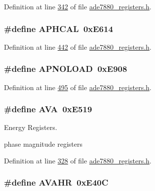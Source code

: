 Definition at line \hyperlink{a00036_source_l00342}{342} of file \hyperlink{a00036_source}{ade7880\-\_\-registers.\-h}.

\hypertarget{a00036_af7bcab75b737ab6d6d02cea33593a062}{
\subsubsection[{A\-P\-H\-C\-A\-L}]{\setlength{\rightskip}{0pt plus 5cm}\#define A\-P\-H\-C\-A\-L~0x\-E614}}\label{de/d8c/a00036_af7bcab75b737ab6d6d02cea33593a062}


Definition at line \hyperlink{a00036_source_l00442}{442} of file \hyperlink{a00036_source}{ade7880\-\_\-registers.\-h}.

\hypertarget{a00036_af3cf7b8f5e0068d118ba353733b37057}{
\subsubsection[{A\-P\-N\-O\-L\-O\-A\-D}]{\setlength{\rightskip}{0pt plus 5cm}\#define A\-P\-N\-O\-L\-O\-A\-D~0x\-E908}}\label{de/d8c/a00036_af3cf7b8f5e0068d118ba353733b37057}


Definition at line \hyperlink{a00036_source_l00495}{495} of file \hyperlink{a00036_source}{ade7880\-\_\-registers.\-h}.

\hypertarget{a00036_ae7cdec48ca69414825f989d1e54ac75e}{
\subsubsection[{A\-V\-A}]{\setlength{\rightskip}{0pt plus 5cm}\#define A\-V\-A~0x\-E519}}\label{de/d8c/a00036_ae7cdec48ca69414825f989d1e54ac75e}


Energy Registers. 

phase magnitude registers 

Definition at line \hyperlink{a00036_source_l00328}{328} of file \hyperlink{a00036_source}{ade7880\-\_\-registers.\-h}.

\hypertarget{a00036_abf7b2fd4affddefe36eeb6297578aae7}{
\subsubsection[{A\-V\-A\-H\-R}]{\setlength{\rightskip}{0pt plus 5cm}\#define A\-V\-A\-H\-R~0x\-E40\-C}}\label{de/d8c/a00036_abf7b2fd4affddefe36eeb6297578aae7}


